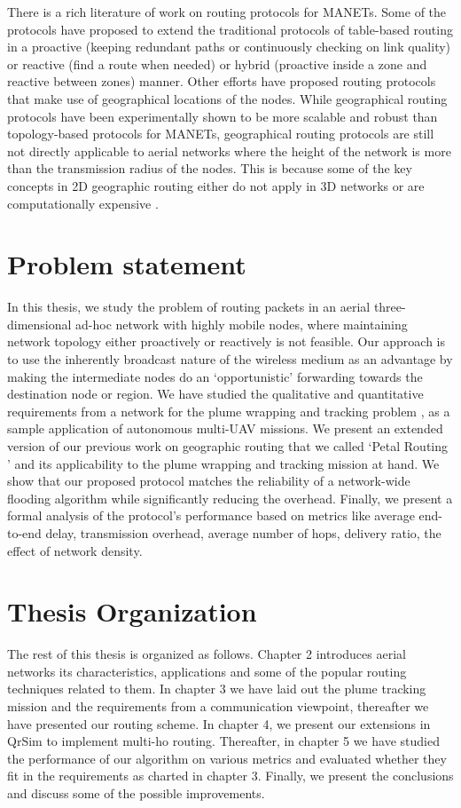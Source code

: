 There is a rich literature of work on routing protocols for MANETs. Some of the protocols have proposed to extend the traditional protocols of table-based routing in a proactive (keeping redundant paths or continuously checking on link quality) or reactive (find a route when needed) or hybrid (proactive inside a zone and reactive between zones) manner. Other efforts have proposed routing protocols that make use of geographical locations of the nodes. While geographical routing protocols have been experimentally shown to be more scalable and robust than topology-based protocols for MANETs, geographical routing protocols are still not directly applicable to aerial networks where the height of the network is more than the transmission radius of the nodes. This is because some of the key concepts in 2D geographic routing either do not apply in 3D networks or are computationally expensive \cite{6238283}.

\section{Problem statement}

In this thesis, we study the problem of routing packets in an aerial three-dimensional ad-hoc network with highly mobile nodes, where maintaining network topology either proactively or reactively is not feasible. Our approach is to use the inherently broadcast nature of the wireless medium as an advantage by making the intermediate nodes do an `opportunistic' forwarding towards the destination node or region. We have studied the qualitative and quantitative requirements from a network for the plume wrapping and tracking problem \cite{8080382}, as a sample application of autonomous multi-UAV missions. We present an extended version of our previous work on geographic routing that we called `Petal Routing \cite{6133499}' and its applicability to the plume wrapping and tracking mission at hand. We show that our proposed protocol matches the reliability of a network-wide flooding algorithm while significantly reducing the overhead. Finally, we present a formal analysis of the protocol's performance based on metrics like average end-to-end delay, transmission overhead, average number of hops, delivery ratio, the effect of network density.


\section{Thesis Organization} 

The rest of this thesis is organized as follows. Chapter 2 introduces aerial networks its characteristics, applications and some of the popular routing techniques related to them. In chapter 3 we have laid out the plume tracking mission and the requirements from a communication viewpoint, thereafter we have presented our routing scheme. In chapter 4, we present our extensions in QrSim to implement multi-ho routing. Thereafter, in chapter 5 we have studied the performance of our algorithm on various metrics and evaluated whether they fit in the requirements as charted in chapter 3. Finally, we present the conclusions and discuss some of the possible improvements.